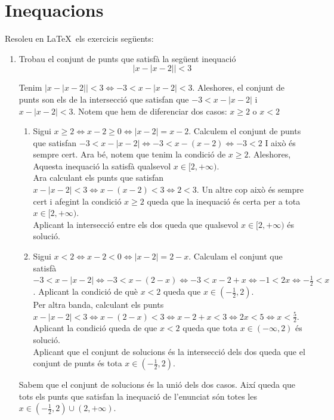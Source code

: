 \section{Inequacions}
Resoleu en \LaTeX\ els exercicis següents:
\begin{enumerate}
    \item Trobau el conjunt de punts que satisfà la següent inequació
    \begin{equation}
        |x-|x-2|| < 3
    \end{equation}
    
    Tenim $|x-|x-2|| < 3 \Leftrightarrow -3 < x - |x-2| < 3$.
    Aleshores, el conjunt de punts son els de la intersecció que satisfan que $-3 < x - |x-2|$ i $x - |x-2| < 3$. Notem que hem de diferenciar dos casos: $x\geq2$ o $x<2$
    \begin{enumerate}
        \item Sigui $x\geq2 \Leftrightarrow x-2\geq0 \Leftrightarrow |x-2| = x-2$.
        Calculem el conjunt de punts que satisfan $-3 < x - |x-2| \Leftrightarrow -3 < x - (x-2) \Leftrightarrow -3 < 2$ I això és sempre cert. Ara bé, notem que tenim la condició de $x\ge2$. Aleshores, Aquesta inequació la satisfà qualsevol $x\in[2, +\infty) $.\\
        Ara calculant els punts que satisfan $x - |x-2| < 3 \Leftrightarrow x - (x - 2) < 3 \Leftrightarrow 2 < 3$. Un altre cop això és sempre cert i afegint la condició $x\geq2$ queda que la inequació és certa per a tota $x\in[2, +\infty)$.\\
        Aplicant la intersecció entre els dos queda que qualsevol $x\in[2, +\infty)$ és solució.

        \item Sigui $x<2 \Leftrightarrow x-2<0 \Leftrightarrow |x-2| = 2-x$.
        Calculam el conjunt que satisfà $-3<x - |x-2| \Leftrightarrow -3<x-(2-x) \Leftrightarrow -3 < x-2+x \Leftrightarrow -1 < 2x \Leftrightarrow -\frac{1}{2} < x$. Aplicant la condició de què $x<2$ queda que $x\in(-\frac{1}{2}, 2)$.\\
        Per altra banda, calculant els punts $x - |x-2| < 3 \Leftrightarrow x -(2-x) < 3 \Leftrightarrow x - 2 + x < 3 \Leftrightarrow 2x < 5 \Leftrightarrow x<\frac{5}{2}$. Aplicant la condició queda de que $x<2$ queda que tota $x\in(-\infty, 2)$ és solució.\\
        Aplicant que el conjunt de solucions és la intersecció dels dos queda que el conjunt de punts és tota $x\in(-\frac{1}{2}, 2)$.
    \end{enumerate}
    Sabem que el conjunt de solucions és la unió dels dos casos. Així queda que tots els punts que satisfan la inequació de l'enunciat són totes les $x\in(-\frac{1}{2}, 2) \cup (2, +\infty)$.


\end{enumerate}
